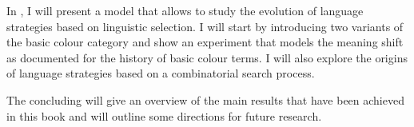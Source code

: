 In , I
will present a model that allows to study the evolution of language
strategies based on linguistic selection. I will start by introducing
two variants of the basic colour category and show an experiment that
models the meaning shift as documented for the history of basic colour
terms. I will also explore the origins of language strategies based on
a combinatorial search process.

The concluding  will give an overview of
the main results that have been achieved in this book and will
outline some directions for future research.
